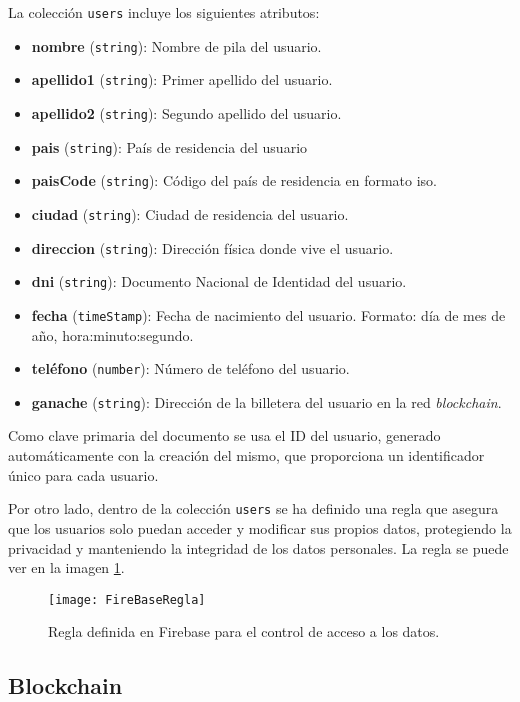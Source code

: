 La colección \texttt{users} incluye los siguientes atributos:
\begin{itemize}
 	\item \textbf{nombre} (\texttt{string}): Nombre de pila del usuario.
    \item \textbf{apellido1} (\texttt{string}): Primer apellido del
     usuario.
    \item \textbf{apellido2} (\texttt{string}): Segundo apellido del
     usuario.
    \item \textbf{pais} (\texttt{string}): País de residencia del usuario
    \item \textbf{paisCode} (\texttt{string}): Código del país de
     residencia en formato iso.
    \item \textbf{ciudad} (\texttt{string}): Ciudad de residencia del
     usuario.
    \item \textbf{direccion} (\texttt{string}): Dirección física donde vive
     el usuario.
    \item \textbf{dni} (\texttt{string}): Documento Nacional de Identidad
     del usuario.
    \item \textbf{fecha} (\texttt{timeStamp}): Fecha de nacimiento del
     usuario. Formato: día de mes de año, hora:minuto:segundo.
    \item \textbf{teléfono} (\texttt{number}): Número de teléfono del
     usuario.
    \item \textbf{ganache} (\texttt{string}): Dirección de la billetera del
     usuario en la red \textit{blockchain}.
\end{itemize}

Como clave primaria del documento se usa el ID del usuario, generado automáticamente con la creación del mismo, que proporciona un identificador único para cada usuario.

Por otro lado, dentro de la colección \texttt{users} se ha definido una regla que asegura que los usuarios solo puedan acceder y modificar sus propios datos, protegiendo la privacidad y manteniendo la integridad de los datos personales. La regla se puede ver en la imagen \ref{fig:FireBaseRegla}.

\begin{figure}[h]
	\centering
	\texttt{[image: FireBaseRegla]}
	\caption[Regla Firebase]{Regla definida en Firebase para el control de acceso a los datos.}
	\label{fig:FireBaseRegla}
\end{figure}


\subsection{Blockchain}

